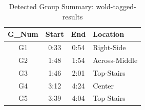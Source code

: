 \begin{table}[H]
    \centering
    \caption{Detected Group Summary: wold-tagged-results}
    \label{tab:group-summary-5}
    \begin{tabular}{c c c l}
        \toprule
        \textbf{G\_Num} & \textbf{Start} & \textbf{End} & \textbf{Location} \\
        \midrule
        G1 & 0:33 & 0:54 & Right-Side \\
        G2 & 1:48 & 1:54 & Across-Middle \\
        G3 & 1:46 & 2:01 & Top-Stairs \\
        G4 & 3:12 & 4:24 & Center \\
        G5 & 3:39 & 4:04 & Top-Stairs \\
        \bottomrule
    \end{tabular}
\end{table}
